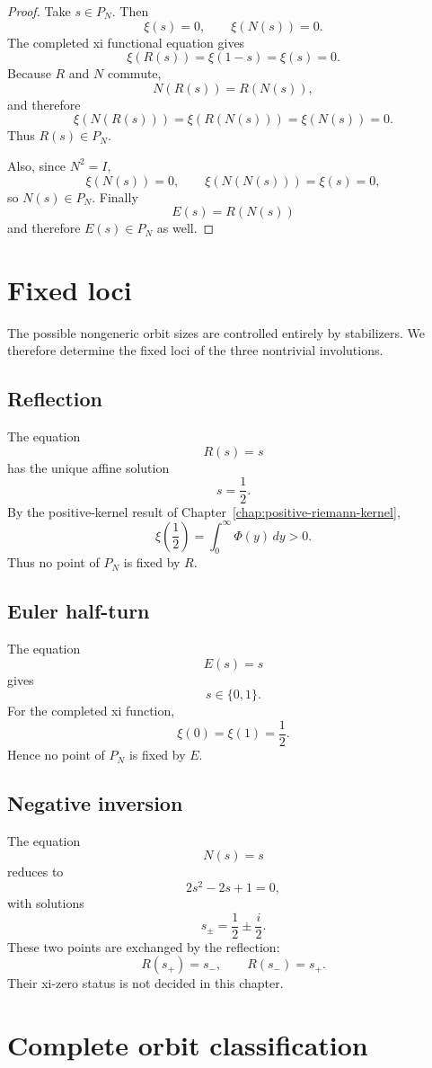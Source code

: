 \begin{proof}
Take $s\in P_N$.  Then
\[
 \xi(s)=0,
 \qquad
 \xi(N(s))=0.
\]
The completed xi functional equation gives
\[
 \xi(R(s))=\xi(1-s)=\xi(s)=0.
\]
Because $R$ and $N$ commute,
\[
 N(R(s))=R(N(s)),
\]
and therefore
\[
 \xi(N(R(s)))=\xi(R(N(s)))=\xi(N(s))=0.
\]
Thus $R(s)\in P_N$.

Also, since $N^2=I$,
\[
 \xi(N(s))=0,
 \qquad
 \xi(N(N(s)))=\xi(s)=0,
\]
so $N(s)\in P_N$.  Finally
\[
 E(s)=R(N(s))
\]
and therefore $E(s)\in P_N$ as well.
\end{proof}

\section{Fixed loci}

The possible nongeneric orbit sizes are controlled entirely by stabilizers.  We therefore determine the fixed loci of the three nontrivial involutions.

\subsection{Reflection}

The equation
\[
 R(s)=s
\]
has the unique affine solution
\[
 s=\frac12.
\]
By the positive-kernel result of Chapter~\ref{chap:positive-riemann-kernel},
\[
 \xi\!\left(\frac12\right)
 =\int_0^\infty \Phi(y)\,dy
 >0.
\]
Thus no point of $P_N$ is fixed by $R$.

\subsection{Euler half-turn}

The equation
\[
 E(s)=s
\]
gives
\[
 s\in\{0,1\}.
\]
For the completed xi function,
\[
 \xi(0)=\xi(1)=\frac12.
\]
Hence no point of $P_N$ is fixed by $E$.

\subsection{Negative inversion}

The equation
\[
 N(s)=s
\]
reduces to
\[
 2s^2-2s+1=0,
\]
with solutions
\[
 s_\pm=\frac12\pm\frac{i}{2}.
\]
These two points are exchanged by the reflection:
\[
 R(s_+)=s_-,
 \qquad
 R(s_-)=s_+.
\]
Their xi-zero status is not decided in this chapter.

\section{Complete orbit classification}

